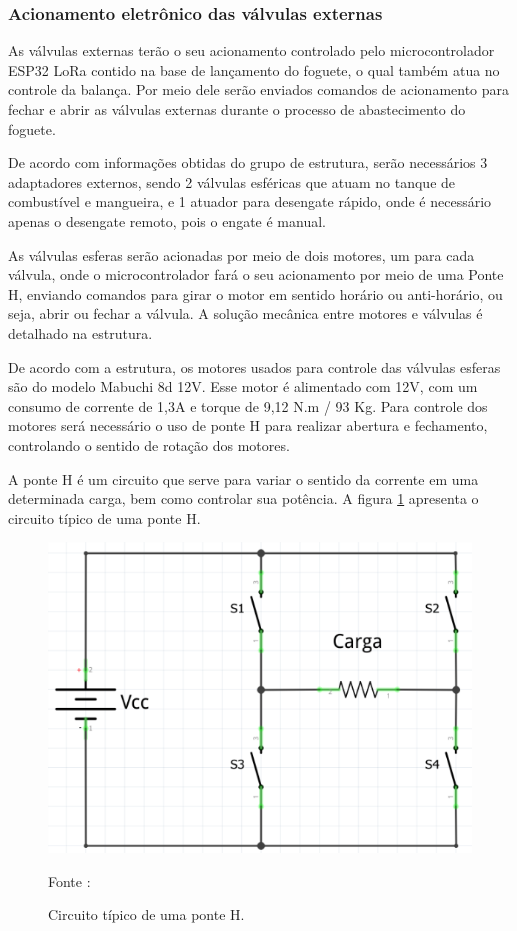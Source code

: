 \subsubsection{Acionamento eletrônico das válvulas externas}

As válvulas externas terão o seu acionamento controlado pelo microcontrolador ESP32 LoRa contido na base de lançamento do foguete, o qual também atua no controle da balança. Por meio dele serão enviados comandos de acionamento para fechar e abrir as válvulas externas durante o processo de abastecimento do foguete.

De acordo com informações obtidas do grupo de estrutura, serão necessários 3 adaptadores externos, sendo 2 válvulas esféricas que atuam no tanque de combustível e mangueira, e 1 atuador para desengate rápido, onde é necessário apenas o desengate remoto, pois o engate é manual. 

As válvulas esferas serão acionadas por meio de dois motores, um para cada válvula, onde o microcontrolador fará o seu acionamento por meio de uma Ponte H, enviando comandos para girar o motor em sentido horário ou anti-horário, ou seja, abrir ou fechar a válvula. A solução mecânica entre motores e válvulas é detalhado na estrutura.

De acordo com a estrutura, os motores usados para controle das válvulas esferas são do modelo Mabuchi 8d 12V. Esse motor é alimentado com 12V, com um consumo de corrente de 1,3A e torque de 9,12 N.m / 93 Kg. Para controle dos motores será necessário o uso de ponte H para realizar abertura e fechamento, controlando o sentido de rotação dos motores. 

A ponte H é um circuito que serve para variar o sentido da corrente em uma determinada carga, bem como controlar sua potência. A figura \ref{fig:PonteH_circuito} apresenta o circuito típico de uma ponte H.

\begin{figure}[H]
  \centering
  \includegraphics[scale=0.3]{figuras/ponteH_circuito.png}
  \caption{ Circuito típico de uma ponte H.} 
  {\footnotesize Fonte : \cite{PonteH_Teoria}} 
  \label{fig:PonteH_circuito}
\end{figure}

